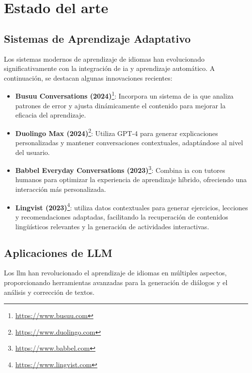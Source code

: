 \chapter{Estado del arte}
\label{estado-del-arte}

\section{Sistemas de Aprendizaje Adaptativo}
Los sistemas modernos de aprendizaje de idiomas han evolucionado significativamente con la integración de \gls{ia} y aprendizaje automático. A continuación, se destacan algunas innovaciones recientes:

\begin{itemize}
  \item \textbf{Busuu Conversations (2024)}\footnote{\url{https://www.busuu.com}}: Incorpora un sistema de \gls{ia} que analiza patrones de error y ajusta dinámicamente el contenido para mejorar la eficacia del aprendizaje.
  \item \textbf{Duolingo Max (2024)}\footnote{\url{https://www.duolingo.com}}: Utiliza GPT-4 para generar explicaciones personalizadas y mantener conversaciones contextuales, adaptándose al nivel del usuario.
  \item \textbf{Babbel Everyday Conversations (2023)}\footnote{\url{https://www.babbel.com}}: Combina \gls{ia} con tutores humanos para optimizar la experiencia de aprendizaje híbrido, ofreciendo una interacción más personalizada.
  \item \textbf{Lingvist (2023)}\footnote{\url{https://www.lingvist.com}}: utiliza datos contextuales para generar ejercicios, lecciones y recomendaciones adaptadas, facilitando la recuperación de contenidos lingüísticos relevantes y la generación de actividades interactivas.
\end{itemize}

\section{Aplicaciones de LLM}
Los \gls{llm} han revolucionado el aprendizaje de idiomas en múltiples aspectos, proporcionando herramientas avanzadas para la generación de diálogos y el análisis y corrección de textos.

